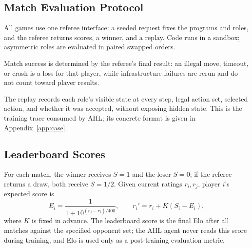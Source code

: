 \subsection{Match Evaluation Protocol}
\label{sec:arena-eval}

All games use one referee interface: a seeded request fixes the programs and roles, and
the referee returns scores, a winner, and a replay. Code runs in a sandbox; asymmetric
roles are evaluated in paired swapped orders.

Match success is determined by the referee's final result: an illegal move, timeout,
or crash is a loss for that player, while infrastructure failures are rerun and do not
count toward player results.

The replay records each role's visible state at every step, legal action set, selected
action, and whether it was accepted, without exposing hidden state. This is the training
trace consumed by AHL; its concrete format is given in Appendix~\ref{app:case}.

\subsection{Leaderboard Scores}

For each match, the winner receives $S=1$ and the loser $S=0$; if the referee returns a
draw, both receive
$S=1/2$. Given current ratings $r_i,r_j$, player $i$'s expected score is
\[
E_i=\frac{1}{1+10^{(r_j-r_i)/400}},
\qquad r_i' = r_i + K(S_i-E_i),
\]
where $K$ is fixed in advance. The leaderboard score is the final Elo after all matches
against the specified opponent set; the AHL agent never reads this score during training,
and Elo is used only as a post-training evaluation metric.

